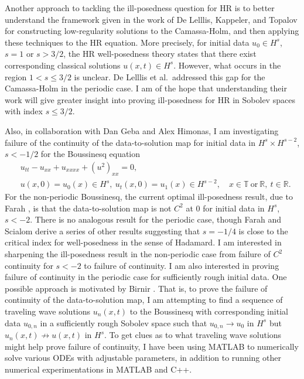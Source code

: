 \documentclass[12pt,reqno]{amsart}
\newcommand{\rr}{\mathbb{R}}
\newcommand{\ci}{\mathbb{T}}
\begin{document}
Another approach to tackling the ill-posedness question for HR is to better
understand the framework given in the work of De Lelllis, Kappeler, and Topalov
\cite{Lellis_2007_Low-regularity-} for constructing low-regularity solutions to
the Camassa-Holm, and then applying these techniques to the HR equation. More
precisely, for initial data $u_{0} \in H^{s}$, $s =1$ or $s > 3/2$, the HR
well-posedness theory states that there exist corresponding classical solutions
$u(x,t) \in H^{s}$. However, what occurs in the region $1 < s \le 3/2$ is
unclear. De Lelllis et al.\ addressed this gap for the Camassa-Holm in the
periodic case. I am of the hope that understanding their work will give greater
insight into proving ill-posedness for HR in Sobolev spaces with index $s \le
3/2$. 

Also, in collaboration with Dan Geba and Alex Himonas,
I am investigating failure of the continuity of the data-to-solution map for
initial data in $H^{s} \times H^{s-2}$, $s < -1/2$ for the Boussinesq equation
\begin{align}
   & u_{tt} - u_{xx} + u_{xxxx} + (u^{2})_{xx} = 0,
  \\
   & u(x,0) = u_{0}(x) \in H^{s}, \  u_{t}(x,0) = u_{1}(x) \in H^{s-2},
  \quad x \in \ci \ \text{or} \ \rr, \ t \in \rr. 
\end{align} 
For the non-periodic Boussinesq, the current optimal ill-posedness result, due to Farah
\cite{Farah:2009uq}, is that the data-to-solution map is not $C^{2}$ at $0$ for
initial data in $H^{s}$, $s < -2$. There is no analogous result for the periodic
case, though Farah and Scialom \cite{Farah:2010ys} derive a series of other
results suggesting that $s = -1/4$ is close to the critical index for
well-posedness in the sense of Hadamard. I am interested in sharpening the
ill-posedness result in the non-periodic case from failure of $C^{2}$ continuity for $s
< -2$ to failure of continuity. I am also interested in proving failure of
continuity in the periodic case for sufficiently rough initial data. One
possible approach is motivated by Birnir
\cite{Birnir:1996uq}. That is, to prove the failure of continuity of the
data-to-solution map, I am attempting to find a sequence of traveling wave
solutions $u_{n}(x,t)$ to the Boussinesq with corresponding initial data
$u_{0,n}$ in a sufficiently rough Sobolev space such that $u_{0,n} \to u_{0}$ in
$H^{s}$ but $u_{n}(x,t) \not \to u(x,t)$ in $H^{s}$. To get clues as to
what traveling wave solutions might help prove failure of continuity, I
have been using MATLAB to numerically solve various ODEs with adjustable
parameters, in addition to running other numerical experimentations in MATLAB
and C++. 
\end{document}
